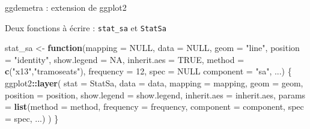 \documentclass[10pt,xcolor=table,color={dvipsnames,usenames},ignorenonframetext,usepdftitle=false,french]{beamer}
\newenvironment{Shaded}{\begin{snugshade}}{\end{snugshade}}
\newcommand{\ControlFlowTok}[1]{\textcolor[rgb]{0.13,0.29,0.53}{\textbf{#1}}}
\newcommand{\DataTypeTok}[1]{\textcolor[rgb]{0.13,0.29,0.53}{#1}}
\newcommand{\DecValTok}[1]{\textcolor[rgb]{0.00,0.00,0.81}{#1}}
\newcommand{\KeywordTok}[1]{\textcolor[rgb]{0.13,0.29,0.53}{\textbf{#1}}}
\newcommand{\NormalTok}[1]{#1}
\newcommand{\OperatorTok}[1]{\textcolor[rgb]{0.81,0.36,0.00}{\textbf{#1}}}
\newcommand{\OtherTok}[1]{\textcolor[rgb]{0.56,0.35,0.01}{#1}}
\newcommand{\StringTok}[1]{\textcolor[rgb]{0.31,0.60,0.02}{#1}}
\begin{document}
\begin{frame}[fragile]{ggdemetra : extension de ggplot2}
\protect\hypertarget{ggdemetra-extension-de-ggplot2-6}{}

Deux fonctions à écrire : \texttt{stat\_sa} et \texttt{StatSa}

\footnotesize

\begin{Shaded}
\begin{Highlighting}[]
\NormalTok{stat_sa <-}\StringTok{ }\ControlFlowTok{function}\NormalTok{(}\DataTypeTok{mapping =} \OtherTok{NULL}\NormalTok{, }\DataTypeTok{data =} \OtherTok{NULL}\NormalTok{, }\DataTypeTok{geom =} \StringTok{"line"}\NormalTok{,}
                    \DataTypeTok{position =} \StringTok{"identity"}\NormalTok{, }\DataTypeTok{show.legend =} \OtherTok{NA}\NormalTok{, }
                    \DataTypeTok{inherit.aes =} \OtherTok{TRUE}\NormalTok{,}
                    \DataTypeTok{method =} \KeywordTok{c}\NormalTok{(}\StringTok{"x13"}\NormalTok{,}\StringTok{"tramoseats"}\NormalTok{),}
                    \DataTypeTok{frequency =} \DecValTok{12}\NormalTok{, }\DataTypeTok{spec =} \OtherTok{NULL}
                    \DataTypeTok{component =} \StringTok{"sa"}\NormalTok{,}
\NormalTok{                    ...) \{}
\NormalTok{    ggplot2}\OperatorTok{::}\KeywordTok{layer}\NormalTok{(}
        \DataTypeTok{stat =}\NormalTok{ StatSa, }\DataTypeTok{data =}\NormalTok{ data, }\DataTypeTok{mapping =}\NormalTok{ mapping, }\DataTypeTok{geom =}\NormalTok{ geom, }
        \DataTypeTok{position =}\NormalTok{ position, }\DataTypeTok{show.legend =}\NormalTok{ show.legend,}
        \DataTypeTok{inherit.aes =}\NormalTok{ inherit.aes,}
        \DataTypeTok{params =} \KeywordTok{list}\NormalTok{(}\DataTypeTok{method =}\NormalTok{ method, }\DataTypeTok{frequency =}\NormalTok{ frequency,}
                      \DataTypeTok{component =}\NormalTok{ component,}
                      \DataTypeTok{spec =}\NormalTok{ spec, ...)}
\NormalTok{    )}
\NormalTok{\}}
\end{Highlighting}
\end{Shaded}

\end{frame}
\end{document}
